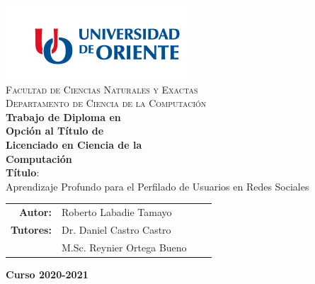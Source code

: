 \documentclass[11pt, letterpaper]{report}
\begin{document}
	\begin{titlepage}
	\begin{minipage}[t]{0.48\textwidth}
		\BgThispage
		\parbox{\textwidth}{}
	\end{minipage}
	\begin{minipage}[t]{0.55\textwidth}
			\parbox{\textwidth}{
				\includegraphics[width=.8\textwidth]{images/logo.png}\\[0.5cm]
				\centering\textsc{Facultad de Ciencias Naturales y Exactas}\\[0.2cm]
				\centering\textsc{Departamento de Ciencia de la Computación}\\[2.2cm]
				\textbf{\LARGE Trabajo de Diploma en\\[-.1cm]Opción al Título de\\[-.1cm]Licenciado en Ciencia de la\\[-.1cm]Computación\\[2.2cm]}
				\Large  \textbf{Título}:\\
				\fontsize{18pt}{20pt}\selectfont Aprendizaje Profundo para el Perfilado de Usuarios en Redes Sociales\\
				\vspace{10mm}
				\begin{tabular}{rp{}ll}
					{\Large \bf Autor:} & {\Large Roberto Labadie Tamayo} \\[.5cm]
					{\Large \bf Tutores:} & {\Large Dr. Daniel Castro Castro} \\[.5cm]
					& {\Large M.Sc. Reynier Ortega Bueno} \\[.5cm]
				\end{tabular}
				
				\vspace{10mm}
				{\Large \textbf{Curso 2020-2021}}
			}
	\end{minipage}
	\end{titlepage}
	
	\thispagestyle{empty} 	
	\chapterfont{\flushright}
	\renewcommand{\contentsname}{Contenido} \tableofcontents
	\renewcommand{\listfigurename}{Lista de Figuras} \listoffigures	
	\renewcommand{\listtablename}{Lista de Tablas} \listoftables
	\renewcommand{\tablename}{Tabla}
	\clearpage

	
	
	
	
	
	
	
	\renewcommand{\bibname}{Referencias Bibliográficas}
	
	
\end{document}
